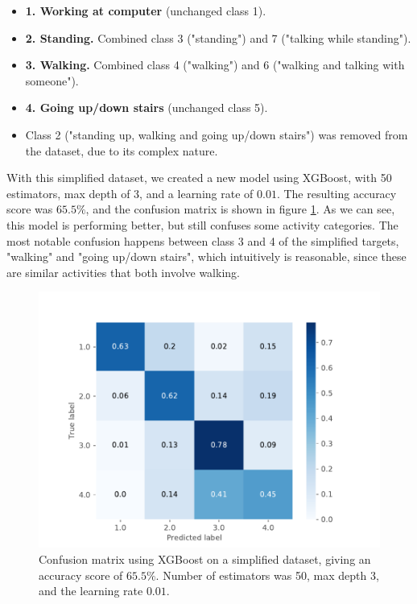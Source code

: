 \begin{itemize}
    \item \textbf{1. Working at computer} (unchanged class 1).
    \item \textbf{2. Standing.} Combined class 3 ("standing") and 7 ("talking while standing").
    \item \textbf{3. Walking.} Combined class 4 ("walking") and 6 ("walking and talking with someone").
    \item \textbf{4. Going up/down stairs} (unchanged class 5).
    \item Class 2 ("standing up, walking and going up/down stairs") was removed from the dataset, due to its complex nature.
\end{itemize}

With this simplified dataset, we created a new model using XGBoost, with 50 estimators, max depth of 3, and a learning rate of $0.01$. The resulting accuracy score was $65.5\%$, and the confusion matrix is shown in figure \ref{fig:xgboost_confusion_matrix_simplified}. As we can see, this model is performing better, but still confuses some activity categories. The most notable confusion happens between class 3 and 4 of the simplified targets, "walking" and "going up/down stairs", which intuitively is reasonable, since these are similar activities that both involve walking.


\begin{figure}
    \centering
    \includegraphics[scale=0.8]{Figures/20191206-182459-confusionmatrix.pdf}
    \caption{Confusion matrix using XGBoost on a simplified dataset, giving an accuracy score of $65.5\%$. Number of estimators was 50, max depth 3, and the learning rate $0.01$.}
    \label{fig:xgboost_confusion_matrix_simplified}
\end{figure}
